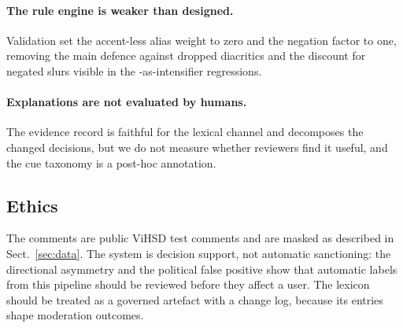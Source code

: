 \paragraph{The rule engine is weaker than designed.} Validation set the accent-less
alias weight to zero and the negation factor to one, removing the main defence against
dropped diacritics and the discount for negated slurs visible in the
\off{}-as-intensifier regressions.

\paragraph{Explanations are not evaluated by humans.} The evidence record is faithful
for the lexical channel and decomposes the changed decisions, but we do not measure
whether reviewers find it useful, and the cue taxonomy is a post-hoc annotation.

\subsection{Ethics}
\label{sec:ethics}

The comments are public ViHSD test comments and are masked as described in
Sect.~\ref{sec:data}. The system is decision support, not automatic sanctioning: the
directional asymmetry and the political false positive show that automatic \hate{}
labels from this pipeline should be reviewed before they affect a user. The lexicon
should be treated as a governed artefact with a change log, because its entries shape
moderation outcomes.
